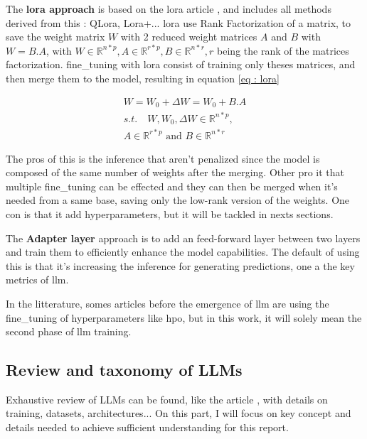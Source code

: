The \textbf{\acrshort{lora} approach} is based on the \acrshort{lora} article \cite{hu_lora_2021}, and includes all methods derived from this : QLora, Lora+... \acrshort{lora} use Rank Factorization of a matrix, to save the weight matrix $W$ with 2 reduced weight matrices $A$ and $B$ with $W = B.A$, with $W \in \mathbb{R}^{n*p}, A \in \mathbb{R}^{r*p} , B \in \mathbb{R}^{n*r}, r$ being the rank of the matrices factorization. \Gls{fine_tuning} with \acrshort{lora} consist of training only theses matrices, and then merge them to the model, resulting in equation \ref{eq : lora}

\begin{equation}
    \begin{split}
    W = W_0 + \Delta W = W_0 + B.A \\
    s.t. \quad W,W_0,\Delta W \in \mathbb{R}^{n*p},\\
    A \in \mathbb{R}^{r*p} \text{ and } B \in \mathbb{R}^{n*r}
    \end{split}
    \label{eq : lora}
\end{equation}

The pros of this is the inference that aren't penalized since the model is composed of the same number of weights after the merging. Other pro it that multiple \gls{fine_tuning} can be effected and they can then be merged when it's needed from a same base, saving only the low-rank version of the weights. One con is that it add hyperparameters, but it will be tackled in nexts sections. 

The \textbf{Adapter layer} approach is to add an feed-forward layer between two layers and train them to efficiently enhance the model capabilities. The default of using this is that it's increasing the inference for generating predictions, one a the key metrics of \acrshort{llm}.

In the litterature, somes articles before the emergence of \acrshort{llm} are using the \gls{fine_tuning} of \glspl{hyperparameter} like \acrfull{hpo}, but in this work, it will solely mean the second phase of \acrshort{llm} training.


\subsection{Review and taxonomy of LLMs}
Exhaustive review of LLMs can be found, like the article \cite{review_llm}, with details on training, datasets, architectures... On this part, I will focus on key concept and details needed to achieve sufficient understanding for this report. 

